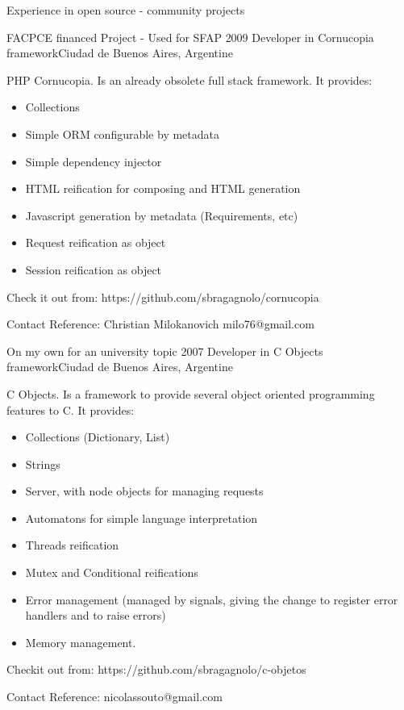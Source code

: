 \documentclass{resume} %
\begin{document}
\begin{rSection}{Experience in open source - community projects}
\begin{rSubsection}{FACPCE financed Project - Used for SFAP }{ 2009 }{Developer in Cornucopia framework}{Ciudad de Buenos Aires, Argentine}	
	\item PHP Cornucopia. Is an already obsolete full stack framework. It provides:
	\begin{itemize}
		\item Collections
		\item Simple ORM configurable by metadata 
		\item Simple dependency injector
		\item HTML reification for composing and HTML generation
		\item Javascript generation by metadata (Requirements, etc)
		\item Request reification as object
		\item Session reification as object
	\end{itemize}
	\item Check it out from: https://github.com/sbragagnolo/cornucopia
	\item Contact Reference: Christian Milokanovich milo76@gmail.com
\end{rSubsection}


\begin{rSubsection}{On my own for an university topic}{ 2007 }{Developer in C Objects framework}{Ciudad de Buenos Aires, Argentine}
	\item C Objects. Is a framework to provide several object oriented programming features to C. It provides:
	\begin{itemize}
		\item Collections (Dictionary, List) 
		\item Strings
		\item Server, with node objects for managing requests
		\item Automatons for simple language interpretation 
		\item Threads reification 
		\item Mutex and Conditional reifications
		\item Error management (managed by signals, giving the change to register error handlers and to raise errors) 
		\item Memory management.
	\end{itemize}
	\item Checkit out from: https://github.com/sbragagnolo/c-objetos
	\item Contact Reference: nicolassouto@gmail.com
\end{rSubsection}


\end{rSection}
\end{document}
